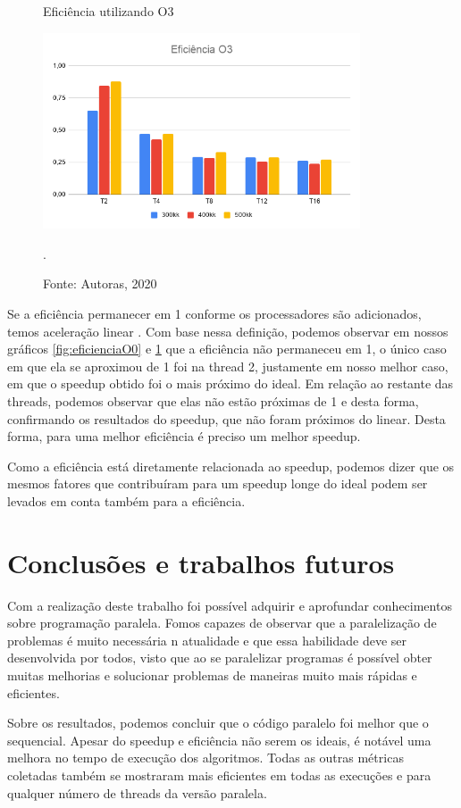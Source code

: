 \documentclass[journal]{IEEEtran}
\begin{document}
\begin{figure}[H]
    \centering
    \caption{Eficiência utilizando O3}
    \centering
    \includegraphics[width=3.7in]{IEEEtran/imagens/EficienciaO3.png}
    \caption*{Fonte: Autoras, 2020}
    \DeclareGraphicsExtensions.
    \label{fig:eficienciaO3}
\end{figure}

Se a eficiência permanecer em 1 conforme os processadores são adicionados, temos aceleração linear \cite{Eager}. Com base nessa definição, podemos observar em nossos gráficos \ref{fig:eficienciaO0} e \ref{fig:eficienciaO3} que a eficiência não permaneceu em 1, o único caso em que ela se aproximou de 1 foi na thread 2, justamente em nosso melhor caso, em que o speedup obtido foi o mais próximo do ideal. Em relação ao restante das threads, podemos observar que elas não estão próximas de 1 e desta forma, confirmando os resultados do speedup, que não foram próximos do linear. Desta forma, para uma melhor eficiência é preciso um melhor speedup.



Como a eficiência está diretamente relacionada ao speedup, podemos dizer que os mesmos fatores que contribuíram para um speedup longe do ideal podem ser levados em conta também para a eficiência.


\section{Conclusões e trabalhos futuros}
Com a realização deste trabalho foi possível adquirir e aprofundar conhecimentos sobre programação paralela. Fomos capazes de observar que a paralelização de problemas é muito necessária n atualidade e que essa habilidade deve ser desenvolvida por todos, visto que ao se paralelizar programas é possível obter muitas melhorias e solucionar problemas de maneiras muito mais rápidas e eficientes.

Sobre os resultados, podemos concluir que o código paralelo foi melhor que o sequencial. Apesar do speedup e eficiência não serem os ideais, é notável uma melhora no tempo de execução dos algoritmos. Todas as outras métricas coletadas também se mostraram mais eficientes em todas as execuções e para qualquer número de threads da versão paralela.
\end{document}
